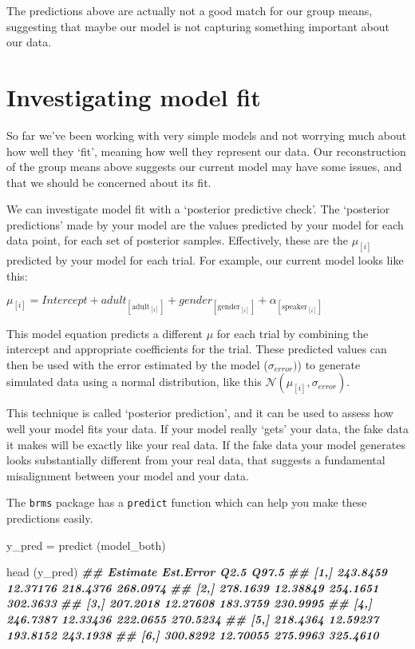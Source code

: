 \documentclass[
]{book}
\newenvironment{Shaded}{\begin{snugshade}}{\end{snugshade}}
\newcommand{\DocumentationTok}[1]{\textcolor[rgb]{0.56,0.35,0.01}{\textbf{\textit{#1}}}}
\newcommand{\FunctionTok}[1]{\textcolor[rgb]{0.00,0.00,0.00}{#1}}
\newcommand{\NormalTok}[1]{#1}
\newcommand{\OtherTok}[1]{\textcolor[rgb]{0.56,0.35,0.01}{#1}}
\begin{document}
The predictions above are actually not a good match for our group means, suggesting that maybe our model is not capturing something important about our data.

\hypertarget{investigating-model-fit}{%
\section{Investigating model fit}\label{investigating-model-fit}}

So far we've been working with very simple models and not worrying much about how well they `fit', meaning how well they represent our data. Our reconstruction of the group means above suggests our current model may have some issues, and that we should be concerned about its fit.

We can investigate model fit with a `posterior predictive check'. The `posterior predictions' made by your model are the values predicted by your model for each data point, for each set of posterior samples. Effectively, these are the \(\mu_{[i]}\) predicted by your model for each trial. For example, our current model looks like this:

\(\mu_{[i]} = Intercept + adult_{[\mathrm{adult}_{[i]}]} + gender_{[\mathrm{gender}_{[i]}]} + \alpha_{[\mathrm{speaker}_{[i]}]}\)

This model equation predicts a different \(\mu\) for each trial by combining the intercept and appropriate coefficients for the trial. These predicted values can then be used with the error estimated by the model (\(\sigma_{error})\)) to generate simulated data using a normal distribution, like this \(\mathcal{N}(\mu_{[i]},\sigma_{error})\).

This technique is called `posterior prediction', and it can be used to assess how well your model fits your data. If your model really `gets' your data, the fake data it makes will be exactly like your real data. If the fake data your model generates looks substantially different from your real data, that suggests a fundamental misalignment between your model and your data.

The \texttt{brms} package has a \texttt{predict} function which can help you make these predictions easily.

\begin{Shaded}
\begin{Highlighting}[]
\NormalTok{y\_pred }\OtherTok{=} \FunctionTok{predict}\NormalTok{ (model\_both)}

\FunctionTok{head}\NormalTok{ (y\_pred)}
\DocumentationTok{\#\#      Estimate Est.Error     Q2.5    Q97.5}
\DocumentationTok{\#\# [1,] 243.8459  12.37176 218.4376 268.0974}
\DocumentationTok{\#\# [2,] 278.1639  12.38849 254.1651 302.3633}
\DocumentationTok{\#\# [3,] 207.2018  12.27608 183.3759 230.9995}
\DocumentationTok{\#\# [4,] 246.7387  12.33436 222.0655 270.5234}
\DocumentationTok{\#\# [5,] 218.4364  12.59237 193.8152 243.1938}
\DocumentationTok{\#\# [6,] 300.8292  12.70055 275.9963 325.4610}
\end{Highlighting}
\end{Shaded}
\end{document}
